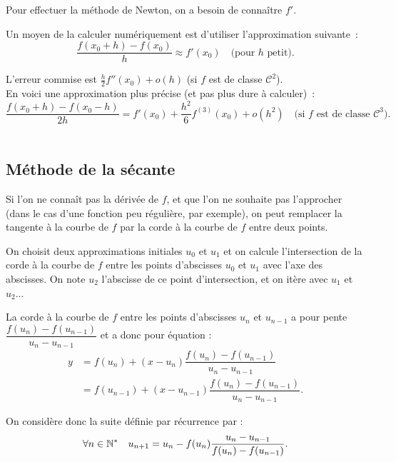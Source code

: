 Pour effectuer la méthode de Newton, on a besoin de connaître $f'$.

Un moyen de la calculer numériquement est d'utiliser l'approximation suivante~:
\begin{equation*}
  \frac{f(x_{0}+h)-f(x_{0})}{h}\approx f'(x_{0}) \quad\text{(pour $h$ petit)}.
\end{equation*}

L'erreur commise est $\frac{h}{2}f''(x_{0}) + o(h)$ (si $f$ est de classe
$\mathcal{C}^{2}$).\\


En voici une approximation plus précise (et pas plus dure à calculer)~:
\begin{equation*}
    \frac{f(x_{0}+h)-f(x_{0}-h)}{2h} = f'(x_{0}) +
    \frac{h^{2}}{6}f^{(3)}(x_0)+o(h^{2})
    \quad\text{(si $f$ est de classe $\mathcal{C}^{3}$)}.
\end{equation*}\\



\subsection{Méthode de la sécante}
Si l'on ne connaît pas la dérivée de $f$, et que l'on ne souhaite pas l'approcher (dans le cas d'une fonction peu régulière, par exemple), on peut remplacer la tangente à la courbe de $f$ par la corde à la courbe de $f$ entre deux points. 

On choisit deux approximations initiales $u_{0}$ et $u_{1}$ et on calcule l'intersection de la corde à la courbe de $f$ entre les points d'abscisses $u_0$ et $u_1$ avec l'axe des abscisses. 
On note $u_2$ l'abscisse de ce point d'intersection, et on itère avec $u_1$ et $u_2$...
\begin{rem}
  La corde à la courbe de $f$ entre les points d'abscisses $u_n$ et $u_{n-1}$ a pour pente $\dfrac{f(u_{n})-f(u_{n-1})}{u_{n}-u_{n-1}}$ et a donc pour équation : 
  \begin{align*}
    y &= f(u_n) + (x-u_n)\dfrac{f(u_{n})-f(u_{n-1})}{u_{n}-u_{n-1}} \\
      &= f(u_{n-1}) + (x-u_{n-1})\dfrac{f(u_{n})-f(u_{n-1})}{u_{n}-u_{n-1}}.
  \end{align*}
\end{rem}
On considère donc la suite définie par récurrence par : 
\begin{equation*}
  \forall n\in\mathbb{N}^{*} \quad u_{n+1} = u_{n} -
  f(u_{n})\frac{u_{n}-u_{n-1}}{f(u_{n})-f(u_{n-1})}.
\end{equation*}

